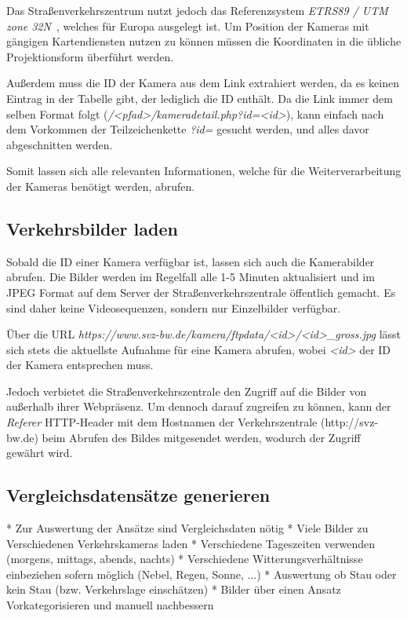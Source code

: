 Das Straßenverkehrszentrum nutzt jedoch das Referenzsystem {\em ETRS89 / UTM zone 32N}~\cite{etrs89}, welches für Europa ausgelegt ist.
Um Position der Kameras mit gängigen Kartendiensten nutzen zu können müssen die Koordinaten in die übliche Projektionsform überführt werden.

Außerdem muss die ID der Kamera aus dem Link extrahiert werden, da es keinen Eintrag in der Tabelle gibt, der lediglich die ID enthält.
Da die Link immer dem selben Format folgt ({\em /<pfad>/kameradetail.php?id=<id>}), kann einfach nach dem Vorkommen der Teilzeichenkette {\em ?id=} gesucht werden, und alles davor abgeschnitten werden.

Somit lassen sich alle relevanten Informationen, welche für die Weiterverarbeitung der Kameras benötigt werden, abrufen.

\subsection{Verkehrsbilder laden}
Sobald die ID einer Kamera verfügbar ist, lassen sich auch die Kamerabilder abrufen.
Die Bilder werden im Regelfall alle 1-5 Minuten aktualisiert und im JPEG Format auf dem Server der Straßenverkehrszentrale öffentlich gemacht.
Es sind daher keine Videosequenzen, sondern nur Einzelbilder verfügbar.

Über die URL {\em https://www.svz-bw.de/kamera/ftpdata/<id>/<id>\_gross.jpg} lässt sich stets die aktuellste Aufnahme für eine Kamera abrufen, wobei {\em <id>} der ID der Kamera entsprechen muss.

Jedoch verbietet die Straßenverkehrszentrale den Zugriff auf die Bilder von außerhalb ihrer Webpräsenz.
Um dennoch darauf zugreifen zu können, kann der {\em Referer} HTTP-Header mit dem Hostnamen der Verkehrszentrale (http://svz-bw.de) beim Abrufen des Bildes mitgesendet werden, wodurch der Zugriff gewährt wird. 

\subsection{Vergleichsdatensätze generieren}
* Zur Auswertung der Ansätze sind Vergleichsdaten nötig\newline
* Viele Bilder zu Verschiedenen Verkehrskameras laden\newline
* Verschiedene Tageszeiten verwenden (morgens, mittags, abends, nachts)\newline
* Verschiedene Witterungsverhältnisse einbeziehen sofern möglich (Nebel, Regen, Sonne, ...)\newline
* Auswertung ob Stau oder kein Stau (bzw. Verkehrslage einschätzen)\newline
* Bilder über einen Ansatz Vorkategorisieren und manuell nachbessern\newline

